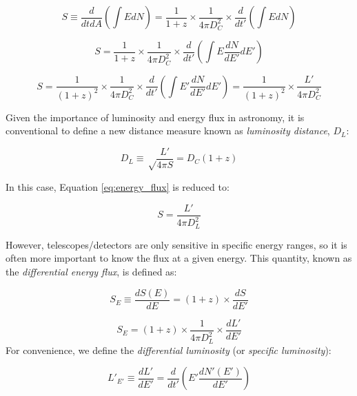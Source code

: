 \begin{equation}
S \equiv \frac{d}{dtdA} \left( \int E dN \right) = \frac{1}{1+z} \times \frac{1}{4 \pi D_{C}^{2}} \times \frac{d}{dt'} \left( \int E dN \right)
\end{equation}

\begin{equation}
S = \frac{1}{1+z} \times \frac{1}{4 \pi D_{C}^{2}} \times \frac{d}{dt'} \left( \int E \frac{dN}{dE'} dE' \right)
\end{equation}

\begin{equation}
S = \frac{1}{(1+z)^{2}} \times \frac{1}{4 \pi D_{C}^{2}} \times \frac{d}{dt'} \left( \int E' \frac{dN}{dE'} dE' \right) =  \frac{1}{(1+z)^{2}} \times \frac{L'}{4 \pi D_{C}^{2}}
\label{eq:energy_flux}
\end{equation}

Given the importance of luminosity and energy flux in astronomy, it is conventional to define a new distance measure known as \emph{luminosity distance}, $D_{L}$:

\begin{equation}
D_{L} \equiv \sqrt\frac{L'}{4 \pi S} = D_{C}(1+z)
\end{equation}

In this case, Equation \ref{eq:energy_flux} is reduced to:

\begin{equation}
S = \frac{L'}{4 \pi D_{L}^{2}}
\end{equation}

However, telescopes/detectors are only sensitive in specific energy ranges, so it is often more important to know the flux at a given energy. This quantity, known as the \emph{differential energy flux}, is defined as:

\begin{equation}
S_{E} \equiv \frac{dS(E)}{dE} = (1+z) \times \frac{dS}{dE'}
\end{equation}

\begin{equation}
S_{E} = (1+z) \times \frac{1}{4 \pi D_{L}^{2}} \times \frac{dL'}{dE'}
\end{equation}
For convenience, we define the \emph{differential luminosity} (or \emph{specific luminosity}):

\begin{equation}
L'_{E'} \equiv  \frac{dL'}{dE'} = \frac{d}{dt'} \left( E' \frac{dN'(E')}{dE'} \right)
\end{equation}

